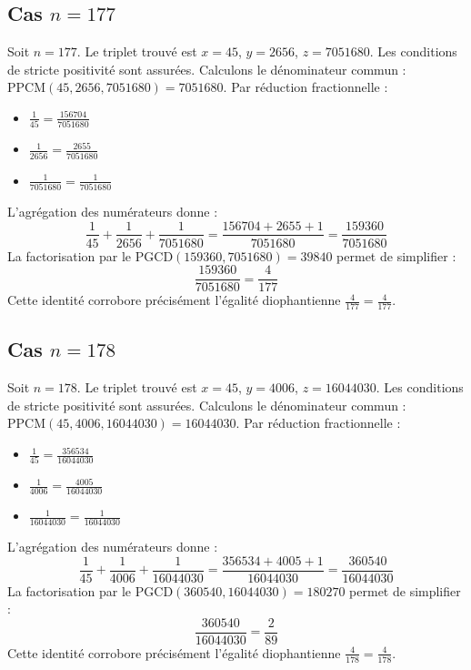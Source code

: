 \documentclass[11pt,a4paper]{article}
\begin{document}
\subsection{Cas $n = 177$}
Soit $n = 177$. Le triplet trouvé est $x = 45$, $y = 2656$, $z = 7051680$.
Les conditions de stricte positivité sont assurées.
Calculons le dénominateur commun : $\text{PPCM}(45, 2656, 7051680) = 7051680$.
Par réduction fractionnelle :
\begin{itemize}
    \item $\frac{1}{45} = \frac{156704}{7051680}$
    \item $\frac{1}{2656} = \frac{2655}{7051680}$
    \item $\frac{1}{7051680} = \frac{1}{7051680}$
\end{itemize}
L'agrégation des numérateurs donne :
$$ \frac{1}{45} + \frac{1}{2656} + \frac{1}{7051680} = \frac{156704 + 2655 + 1}{7051680} = \frac{159360}{7051680} $$
La factorisation par le $\text{PGCD}(159360, 7051680) = 39840$ permet de simplifier :
$$ \frac{159360}{7051680} = \frac{4}{177} $$
Cette identité corrobore précisément l'égalité diophantienne $\frac{4}{177} = \frac{4}{177}$.

\subsection{Cas $n = 178$}
Soit $n = 178$. Le triplet trouvé est $x = 45$, $y = 4006$, $z = 16044030$.
Les conditions de stricte positivité sont assurées.
Calculons le dénominateur commun : $\text{PPCM}(45, 4006, 16044030) = 16044030$.
Par réduction fractionnelle :
\begin{itemize}
    \item $\frac{1}{45} = \frac{356534}{16044030}$
    \item $\frac{1}{4006} = \frac{4005}{16044030}$
    \item $\frac{1}{16044030} = \frac{1}{16044030}$
\end{itemize}
L'agrégation des numérateurs donne :
$$ \frac{1}{45} + \frac{1}{4006} + \frac{1}{16044030} = \frac{356534 + 4005 + 1}{16044030} = \frac{360540}{16044030} $$
La factorisation par le $\text{PGCD}(360540, 16044030) = 180270$ permet de simplifier :
$$ \frac{360540}{16044030} = \frac{2}{89} $$
Cette identité corrobore précisément l'égalité diophantienne $\frac{4}{178} = \frac{4}{178}$.
\end{document}
